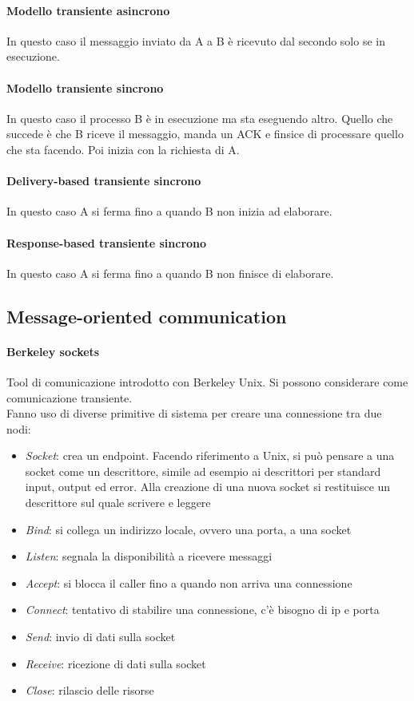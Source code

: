 \paragraph{Modello transiente asincrono}
In questo caso il messaggio inviato da A a B è ricevuto dal secondo 
solo se in esecuzione.

\paragraph{Modello transiente sincrono}
In questo caso il processo B è in esecuzione ma sta eseguendo altro.
Quello che succede è che B riceve il messaggio, manda un ACK e finsice di 
processare quello che sta facendo. Poi inizia con la richiesta di A.

\paragraph{Delivery-based transiente sincrono}
In questo caso A si ferma fino a quando B non inizia ad elaborare.

\paragraph{Response-based transiente sincrono}
In questo caso A si ferma fino a quando B non finisce di elaborare.

\subsection{Message-oriented communication}

\paragraph{Berkeley sockets}
Tool di comunicazione introdotto con Berkeley Unix. Si possono 
considerare come comunicazione transiente.\\
Fanno uso di diverse primitive di sistema per creare una connessione
tra due nodi:
\begin{itemize}
    \item \emph{Socket}: crea un endpoint. Facendo riferimento 
    a Unix, si può pensare a una socket come 
    un descrittore, simile ad esempio ai descrittori per standard input,
    output ed error. Alla creazione di una nuova socket si restituisce un descrittore
    sul quale scrivere e leggere
    \item \emph{Bind}: si collega un indirizzo locale, ovvero una porta, a una socket
    \item \emph{Listen}: segnala la disponibilità a ricevere messaggi
    \item \emph{Accept}: si blocca il caller fino a quando non arriva una connessione
    \item \emph{Connect}: tentativo di stabilire una connessione, c'è bisogno di ip 
    e porta
    \item \emph{Send}: invio di dati sulla socket
    \item \emph{Receive}: ricezione di dati sulla socket
    \item \emph{Close}: rilascio delle risorse
\end{itemize}

